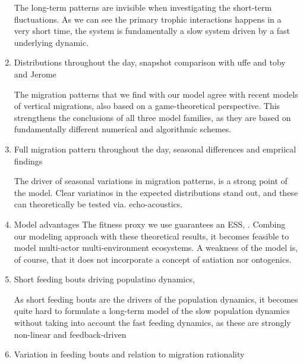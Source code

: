 \begin{enumerate}
  The long-term patterns are invisible when investigating the short-term fluctuations. As we can see the primary trophic interactions happens in a very short time, the system is fundamentally a slow system driven by a fast underlying dynamic.

  \item Distributions throughout the day, snapshot comparison with uffe and toby and Jerome

The migration patterns that we find with our model agree with  recent models of vertical migrations, also based on a game-theoretical perspective. This strengthens the conclusions of all three model families, as they are based on fundamentally different numerical and algorithmic schemes.
  \item Full migration pattern throughout the day, seasonal differences and empriical findings

The driver of seasonal variations in migration patterns, is a strong point of the model. Clear variatinos in the expected distributions stand out, and these can theoretically be tested via. echo-acoustics.





  \item Model advantages
The fitness proxy we use guarantees an ESS, \citep{krivan}. Combing our modeling approach with these theoretical results, it becomes feasible to model multi-actor multi-environment ecosystems. A weakness of the model is, of course, that it does not incorporate a concept of satiation nor ontogenics.

  \item Short feeding bouts driving populatino dynamics,

As short feeding bouts are the drivers of the population dynamics, it becomes quite hard to formulate a long-term model of the slow population dynamics without taking into account the fast feeding dynamics, as these are strongly non-linear and feedback-driven
  \item Variation in feeding bouts and relation to migration rationality


\end{enumerate}
